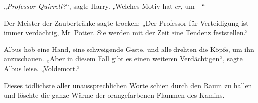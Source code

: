 „\emph{Professor Quirrell?}“, sagte Harry. „Welches Motiv hat \emph{er}, um—“

Der Meister der Zaubertränke sagte trocken: „Der Professor für Verteidigung ist immer verdächtig, Mr~Potter. Sie werden mit der Zeit eine Tendenz feststellen.“

Albus hob eine Hand, eine schweigende Geste, und alle drehten die Köpfe, um ihn anzuschauen. „Aber in diesem Fall gibt es einen weiteren Verdächtigen“, sagte Albus leise. „Voldemort.“

Dieses tödlichste aller unaussprechlichen Worte schien durch den Raum zu hallen und löschte die ganze Wärme der orangefarbenen Flammen des Kamins.

